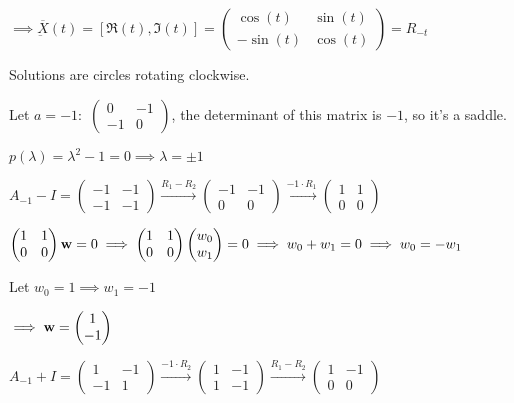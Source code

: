 \documentclass{article}
\begin{document}
$\implies \underbar{\overline{X}}(t) = \left[  \Re(t),\Im(t)\right] =
\begin{pmatrix}\cos(t)&\sin(t)\\
  -\sin(t)&\cos(t)\end{pmatrix} = R_{-t}$

Solutions are circles rotating clockwise.

Let $a = -1:$  $\begin{pmatrix}0&-1\\-1&0\end{pmatrix}$, the determinant
of this matrix is $-1$, so it's a saddle.

$p(\lambda) = \lambda^2-1 = 0 \implies \lambda = \pm 1$

$A_{-1} - I = \begin{pmatrix}-1&-1\\-1&-1\end{pmatrix}
\stackrel{R_1- R_2}{\rightarrow}
\begin{pmatrix} -1&-1\\
  0&0\end{pmatrix}
\stackrel{-1\cdot R_1}{\rightarrow}
\begin{pmatrix} 1&1\\
  0&0\end{pmatrix}$

$\begin{pmatrix} 1&1\\
  0&0\end{pmatrix}\bold{w} = 0
\implies \begin{pmatrix} 1&1\\
  0&0\end{pmatrix}\begin{pmatrix} w_0\\
  w_1\end{pmatrix} = 0 \implies w_0+w_1=0 \implies w_0 = -w_1$

Let $w_0 =1\implies w_1 = -1$

$\implies \bold{w} = \begin{pmatrix} 1\\
  -1\end{pmatrix}$

$A_{-1} + I = \begin{pmatrix}1&-1\\-1&1\end{pmatrix}
\stackrel{-1\cdot R_2}{\rightarrow}
\begin{pmatrix} 1&-1\\
  1&-1\end{pmatrix}
\stackrel{R_1- R_2}{\rightarrow}
\begin{pmatrix} 1&-1\\
  0&0\end{pmatrix}$
\end{document}
